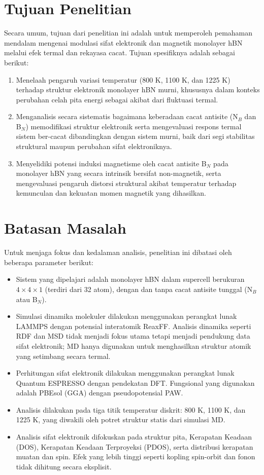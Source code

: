 \section{Tujuan Penelitian}
Secara umum, tujuan dari penelitian ini adalah untuk memperoleh pemahaman mendalam mengenai modulasi sifat elektronik dan magnetik monolayer hBN melalui efek termal dan rekayasa cacat. Tujuan spesifiknya adalah sebagai berikut:
\begin{enumerate}
\item Menelaah pengaruh variasi temperatur (800 K, 1100 K, dan 1225 K) terhadap struktur elektronik monolayer hBN murni, khususnya dalam konteks perubahan celah pita energi sebagai akibat dari fluktuasi termal.

\item Menganalisis secara sistematis bagaimana keberadaan cacat antisite (N$_B$ dan B$_N$) memodifikasi struktur elektronik serta mengevaluasi respons termal sistem ber-cacat dibandingkan dengan sistem murni, baik dari segi stabilitas struktural maupun perubahan sifat elektroniknya.

\item Menyelidiki potensi induksi magnetisme oleh cacat antisite B$_N$ pada monolayer hBN yang secara intrinsik bersifat non-magnetik, serta mengevaluasi pengaruh distorsi struktural akibat temperatur terhadap kemunculan dan kekuatan momen magnetik yang dihasilkan.
\end{enumerate}

\section{Batasan Masalah}
Untuk menjaga fokus dan kedalaman analisis, penelitian ini dibatasi oleh beberapa parameter berikut:
\begin{itemize}
    \item Sistem yang dipelajari adalah monolayer hBN dalam supercell berukuran $4 \times 4 \times 1$ (terdiri dari 32 atom), dengan dan tanpa cacat antisite tunggal (N$_B$ atau B$_N$).
    \item Simulasi dinamika molekuler dilakukan menggunakan perangkat lunak LAMMPS dengan potensial interatomik ReaxFF. Analisis dinamika seperti RDF dan MSD tidak menjadi fokus utama tetapi menjadi pendukung data sifat elektronik; MD hanya digunakan untuk menghasilkan struktur atomik yang setimbang secara termal.
    \item Perhitungan sifat elektronik dilakukan menggunakan perangkat lunak Quantum ESPRESSO dengan pendekatan DFT. Fungsional yang digunakan adalah PBEsol (GGA) dengan pseudopotensial PAW.
    \item Analisis dilakukan pada tiga titik temperatur diskrit: 800 K, 1100 K, dan 1225 K, yang diwakili oleh potret struktur statis dari simulasi MD.
    \item Analisis sifat elektronik difokuskan pada struktur pita, Kerapatan Keadaan (DOS), Kerapatan Keadaan Terproyeksi (PDOS), serta distribusi kerapatan muatan dan spin. Efek yang lebih tinggi seperti kopling spin-orbit dan fonon tidak dihitung secara eksplisit.
\end{itemize}

